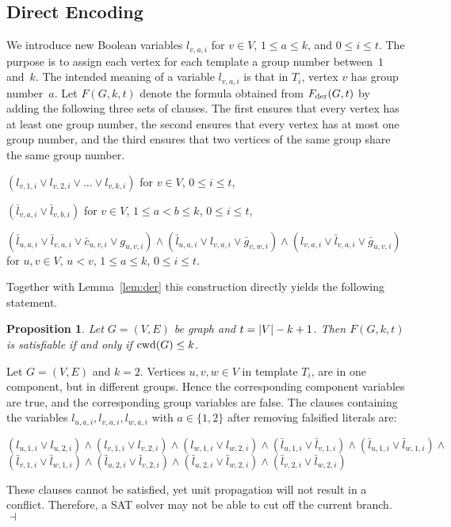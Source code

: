 \documentclass[10pt,usletter]{article}
\newenvironment{myquote}{\begin{center}
    \begin{minipage}{.80\linewidth}}{\end{minipage}\end{center}}
\newtheorem{proposition}{Proposition}
\theoremstyle{remark}
\newtheorem{example}{Example}
\renewenvironment{example}{\begin{ex}}{\hfill
    $\dashv$\end{ex}\medskip}
\newcommand{\cwd}{\text{\normalfont cwd}}
\newcommand{\Fder}{F_{\text{\normalfont der}}}
\begin{document}
\subsection{Direct Encoding}
We introduce new Boolean variables $l_{v,a,i}$ for $v\in V$, $1\leq a \leq k$,
and $0\leq i \leq t$. The purpose is to assign each vertex for each
template a group number between~$1$ and~$k$. The intended meaning of a
variable $l_{v,a,i}$ is that in $T_i$, vertex $v$ has group number~$a$. 
Let $F(G,k,t)$ denote the formula obtained from $\Fder(G,t)$ by adding the
following three sets of clauses. The first ensures that every vertex has at
least one group number, the second ensures that every vertex has at
most one group number, and the third ensures that two vertices of the
same group share the same group number.
\begin{myquote}
  $(l_{v,1,i} \lor l_{v,2,i} \lor \dots \lor l_{v,k,i})$ \qquad for $v
  \in V$, $0\leq i \leq t$,



  $(\bar l_{v,a,i} \lor \bar l_{v,b,i})$ \qquad for $v \in V$, $1 \leq
  a < b \leq k$, $0\leq i \leq t$,



  $(\bar l_{u,a,i} \lor \bar l_{v,a,i} \lor \bar c_{u,v,i} \lor  g_{u,v,i}) \land (\bar
  l_{u,a,i} \lor l_{v,a,i} \lor \bar g_{v,w,i}) \land 
  (l_{v,a,i} \lor \bar l_{v,a,i} \lor  \bar g_{u,v,i})$\\[0.1cm]
  \phantom{x}\hfill for $u,v \in V$, $u < v$, $1 \leq a \leq k$, $0 \leq i \leq
t$.
\end{myquote}

\noindent Together with Lemma~\ref{lem:der} this construction directly yields
the following statement.
\begin{proposition}
  Let $G=(V,E)$ be graph and $t=|V|-k +1$. Then  
  $F(G,k,t)$ is satisfiable if and only if $\cwd(G)\leq k$. 
\end{proposition}


\begin{example}\label{example:unitprop}
  Let $G=(V,E)$ and $k = 2$. Vertices $u, v, w \in
  V$ in template $T_i$,  are in one component, but in different groups.
  Hence the corresponding component variables are true,
  and the corresponding group variables are false.
  The clauses containing the variables $l_{u,a,i}, l_{v,a,i}, l_{w,a,i}$
  with $a \in \{1,2\}$ after removing falsified literals
  are: 
\begin{myquote}
$(l_{u,1,i} \lor l_{u,2,i}) \land (l_{v,1,i} \lor l_{v,2,i}) \land (l_{w,1,i} \lor l_{w,2,i}) \land 
(\bar l_{u,1,i} \lor \bar l_{v,1,i}) \land (\bar l_{u,1,i} \lor \bar l_{w,1,i}) \land \phantom{x}$ \\
$(\bar l_{v,1,i} \lor \bar l_{w,1,i}) \land
(\bar l_{u,2,i} \lor \bar l_{v,2,i}) \land (\bar l_{u,2,i} \lor \bar l_{w,2,i}) \land (\bar l_{v,2,i} \lor \bar l_{w,2,i})$
\end{myquote}
These clauses cannot be satisfied, yet unit propagation will not result in a conflict. 
Therefore, a SAT solver may not be able to cut off the current branch.
\end{example}
 
\end{document}
